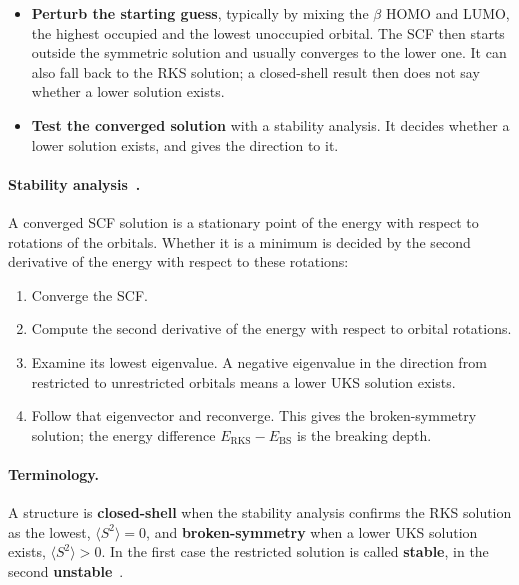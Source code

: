 \begin{itemize}
  \item \textbf{Perturb the starting guess}, typically by mixing the
    $\beta$ HOMO and LUMO, the highest occupied and the lowest
    unoccupied orbital. The SCF then starts outside the symmetric
    solution and usually converges to the lower one. It can also fall back
    to the RKS solution; a closed-shell result then does not say whether a
    lower solution exists.
  \item \textbf{Test the converged solution} with a stability analysis. It
    decides whether a lower solution exists, and gives the direction to
    it.
\end{itemize}

\paragraph{Stability analysis~\cite{cizek1967, seeger1977}.} A converged
SCF solution is a stationary point of the energy with respect to rotations
of the orbitals. Whether it is a minimum is decided by the second
derivative of the energy with respect to these rotations:

\begin{enumerate}
  \item Converge the SCF.
  \item Compute the second derivative of the energy with respect to
    orbital rotations.
  \item Examine its lowest eigenvalue. A negative eigenvalue in the
    direction from restricted to unrestricted orbitals means a lower UKS
    solution exists.
  \item Follow that eigenvector and reconverge. This gives the
    broken-symmetry solution; the energy difference
    $E_\mathrm{RKS} - E_\mathrm{BS}$ is the breaking depth.
\end{enumerate}

\paragraph{Terminology.} A structure is \textbf{closed-shell} when the
stability analysis confirms the RKS solution as the lowest,
$\langle S^2 \rangle = 0$, and \textbf{broken-symmetry} when a lower UKS
solution exists, $\langle S^2 \rangle > 0$. In the first case the
restricted solution is called \textbf{stable}, in the second
\textbf{unstable}~\cite{seeger1977}.

